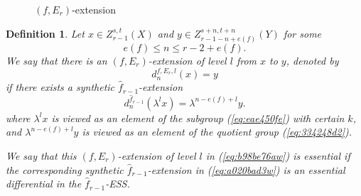 \documentclass[12pt,a4paper]{article}
\newtheorem{definition}[equation]{Definition}
\newcommand{\drawarrow}{\draw[-{Stealth[length=1.5mm]}, shorten >=(0.08cm)]}
\begin{document}
\begin{sloppy}
\begin{figure}[h]
{
\hspace{0.5cm}
}
\caption{$(f,E_r)$-extension}\label{fig:3d966cc4}
\end{figure}

\begin{definition}\label{def:6c076aw33}
    Let $x\in Z^{s,t}_{r-1}(X)$ and $y\in Z^{s+n,t+n}_{r-1-n+e(f)}(Y)$ for some
    $$e(f)\le n\le r-2+e(f).$$
    We say that there is an $(f,E_r)$-extension of level $l$ from $x$ to $y$, denoted by
    \begin{equation}\label{eq:b98be76aw}
    d_{n}^{f,E_r,l}(x)=y
    \end{equation}
    if there exists a synthetic $\hat f_{r-1}$-extension
    \begin{equation}\label{eq:a020bad3w}
        d_{n}^{\hat f_{r-1}}(\lambda^l x)=\lambda^{n-e(f)+l} y.
    \end{equation}
    where $\lambda^l x$ is viewed as an element of the subgroup (\ref{eq:eae450fe}) with certain $k$, and $\lambda^{n-e(f)+l} y$ is viewed as an element of the quotient group (\ref{eq:334248d2}).

   We say that this $(f,E_r)$-extension of level $l$ in (\ref{eq:b98be76aw}) is \emph{essential} if the corresponding synthetic $\hat f_{r-1}$-extension in (\ref{eq:a020bad3w}) is an essential differential in the $\hat f_{r-1}$-ESS.


\end{definition}
\end{sloppy}
\end{document}
